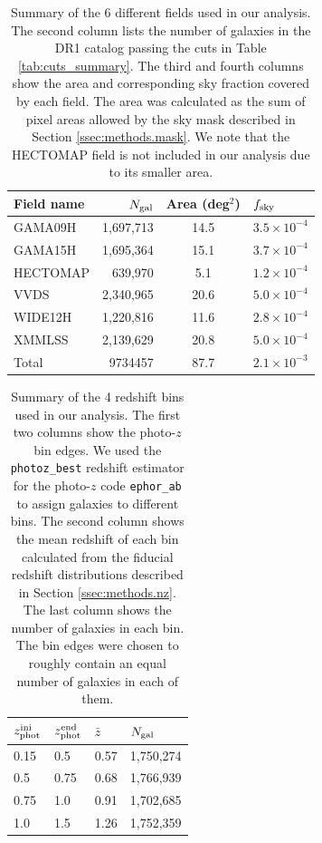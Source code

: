 \documentclass[a4paper,11pt]{article}
\begin{document}
  \begin{table}
  \centering
  \begin{tabular}{|l|r|c|l|}
   \hline
   {\bf Field name} & $N_{\rm gal}$ & {\bf Area} (deg$^2$) & $f_{\rm sky}$ \\
   \hline
   GAMA09H  & 1,697,713 & 14.5 & $3.5\times10^{-4}$ \\
   GAMA15H  & 1,695,364 & 15.1 & $3.7\times10^{-4}$ \\
   HECTOMAP &   639,970 &  5.1 & $1.2\times10^{-4}$ \\
   VVDS     & 2,340,965 & 20.6 & $5.0\times10^{-4}$ \\
   WIDE12H  & 1,220,816 & 11.6 & $2.8\times10^{-4}$ \\
   XMMLSS   & 2,139,629 & 20.8 & $5.0\times10^{-4}$ \\
   \hline
   Total    & 9734457 & 87.7 & $2.1\times10^{-3}$ \\
   \hline
  \end{tabular}
  \caption{Summary of the 6 different fields used in our analysis. The second column lists the number of galaxies in the DR1 catalog passing the cuts in Table \ref{tab:cuts_summary}. The third and fourth columns show the area and corresponding sky fraction covered by each field. The area was calculated as the sum of pixel areas allowed by the sky mask described in Section \ref{ssec:methods.mask}. We note that the HECTOMAP field is not included in our analysis due to its smaller area.} \label{tab:field_summary}
  \end{table}  

  \begin{table}
  \centering
  \begin{tabular}{|l|l|l|l|}
    \hline
    $z_{\rm phot}^{\rm ini}$ & $z_{\rm phot}^{\rm end}$ & $\bar{z}$ & $N_{\rm gal}$ \\
    \hline
    0.15 & 0.5  & 0.57 & 1,750,274 \\
    0.5  & 0.75 & 0.68 & 1,766,939 \\
    0.75 & 1.0  & 0.91 & 1,702,685 \\
    1.0  & 1.5  & 1.26 & 1,752,359 \\
    \hline
  \end{tabular}
  \caption{Summary of the 4 redshift bins used in our analysis. The first two columns show the photo-$z$ bin edges. We used the {\tt photoz\_best} redshift estimator for the photo-$z$ code {\tt ephor\_ab} to assign galaxies to different bins. The second column shows the mean redshift of each bin calculated from the fiducial redshift distributions described in Section \ref{ssec:methods.nz}. The last column shows the number of galaxies in each bin. The bin edges were chosen to roughly contain an equal number of galaxies in each of them.} \label{tab:bins_summary}
  \end{table}
  
\end{document}
